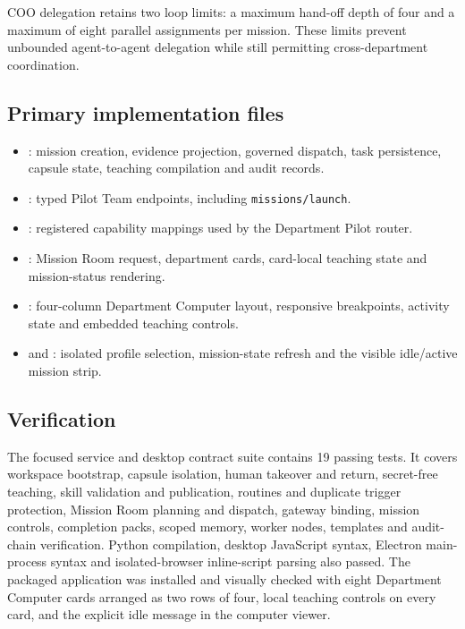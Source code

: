 COO delegation retains two loop limits: a maximum hand-off depth of four and a
maximum of eight parallel assignments per mission. These limits prevent
unbounded agent-to-agent delegation while still permitting cross-department
coordination.

\subsection*{Primary implementation files}

\begin{itemize}[leftmargin=*]
\item {}:
mission creation, evidence projection, governed dispatch, task persistence,
capsule state, teaching compilation and audit records.
\item {}:
typed Pilot Team endpoints, including \texttt{missions/launch}.
\item {}:
registered capability mappings used by the Department Pilot router.
\item {}: Mission Room request,
department cards, card-local teaching state and mission-status rendering.
\item {}: four-column Department
Computer layout, responsive breakpoints, activity state and embedded teaching
controls.
\item {} and
: isolated profile selection,
mission-state refresh and the visible idle/active mission strip.
\end{itemize}

\subsection*{Verification}

The focused service and desktop contract suite contains 19 passing tests. It
covers workspace bootstrap, capsule isolation, human takeover and return,
secret-free teaching, skill validation and publication, routines and duplicate
trigger protection, Mission Room planning and dispatch, gateway binding,
mission controls, completion packs, scoped memory, worker nodes, templates and
audit-chain verification. Python compilation, desktop JavaScript syntax,
Electron main-process syntax and isolated-browser inline-script parsing also
passed. The packaged application was installed and visually checked with eight
Department Computer cards arranged as two rows of four, local teaching controls
on every card, and the explicit idle message in the computer viewer.
